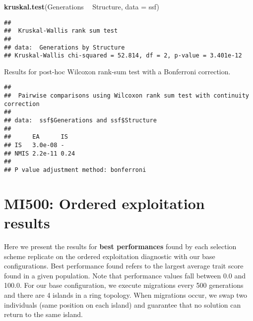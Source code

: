 \documentclass[]{book}
\newenvironment{Shaded}{\begin{snugshade}}{\end{snugshade}}
\newcommand{\DataTypeTok}[1]{\textcolor[rgb]{0.13,0.29,0.53}{#1}}
\newcommand{\KeywordTok}[1]{\textcolor[rgb]{0.13,0.29,0.53}{\textbf{#1}}}
\newcommand{\NormalTok}[1]{#1}
\newcommand{\OperatorTok}[1]{\textcolor[rgb]{0.81,0.36,0.00}{\textbf{#1}}}
\newcommand{\OtherTok}[1]{\textcolor[rgb]{0.56,0.35,0.01}{#1}}
\newcommand{\StringTok}[1]{\textcolor[rgb]{0.31,0.60,0.02}{#1}}
\begin{document}
\begin{Shaded}
\begin{Highlighting}[]
\KeywordTok{kruskal.test}\NormalTok{(Generations }\OperatorTok{~}\StringTok{ }\NormalTok{Structure, }\DataTypeTok{data =}\NormalTok{ ssf)}
\end{Highlighting}
\end{Shaded}

\begin{verbatim}
## 
##  Kruskal-Wallis rank sum test
## 
## data:  Generations by Structure
## Kruskal-Wallis chi-squared = 52.814, df = 2, p-value = 3.401e-12
\end{verbatim}

Results for post-hoc Wilcoxon rank-sum test with a Bonferroni correction.

\begin{Shaded}
\end{Shaded}

\begin{verbatim}
## 
##  Pairwise comparisons using Wilcoxon rank sum test with continuity correction 
## 
## data:  ssf$Generations and ssf$Structure 
## 
##      EA      IS  
## IS   3.0e-08 -   
## NMIS 2.2e-11 0.24
## 
## P value adjustment method: bonferroni
\end{verbatim}

\hypertarget{mi500-ordered-exploitation-results}{%
\chapter{MI500: Ordered exploitation results}\label{mi500-ordered-exploitation-results}}

Here we present the results for \textbf{best performances} found by each selection scheme replicate on the ordered exploitation diagnostic with our base configurations.
Best performance found refers to the largest average trait score found in a given population.
Note that performance values fall between 0.0 and 100.0.
For our base configuration, we execute migrations every 500 generations and there are 4 islands in a ring topology.
When migrations occur, we swap two individuals (same position on each island) and guarantee that no solution can return to the same island.
\end{document}
